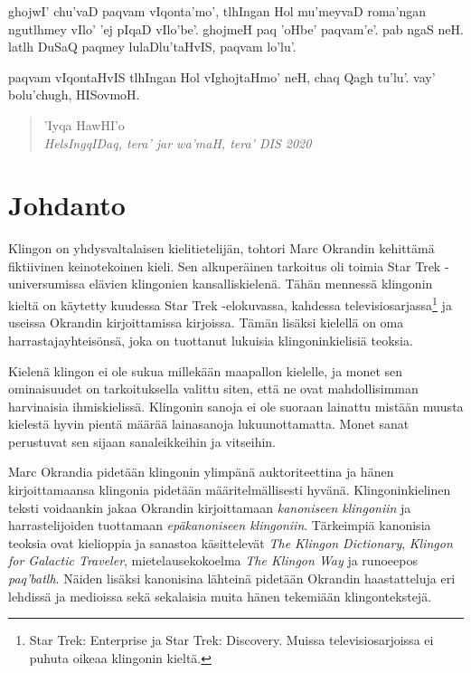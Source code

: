 \documentclass{book}
\begin{document}
ghojwI' chu'vaD paqvam vIqonta'mo', tlhIngan Hol mu'meyvaD roma'ngan ngutlhmey vIlo' 'ej pIqaD vIlo'be'.
ghojmeH paq 'oHbe' paqvam'e'. pab ngaS neH. latlh DuSaQ paqmey lulaDlu'taHvIS, paqvam lo'lu'.

paqvam vIqontaHvIS tlhIngan Hol vIghojtaHmo' neH, chaq Qagh tu'lu'.
vay' bolu'chugh, HISovmoH.

\begin{quote}
    'Iyqa HawHI'o \\
    \textit{HelsIngqIDaq, tera' jar wa'maH, tera' DIS 2020}
\end{quote}

\tableofcontents

\mainmatter

\chapter{Johdanto}

Klingon on yhdysvaltalaisen kielitietelijän, tohtori Marc Okrandin kehittämä fiktiivinen keinotekoinen kieli. Sen alkuperäinen tarkoitus oli toimia Star Trek -universumissa elävien klingonien kansalliskielenä. Tähän mennessä klingonin kieltä on käytetty kuudessa Star Trek -elokuvassa, kahdessa televisiosarjassa\footnote{Star Trek: Enterprise ja Star Trek: Discovery. Muissa televisiosarjoissa ei puhuta oikeaa klingonin kieltä.} ja useissa Okrandin kirjoittamissa kirjoissa. Tämän lisäksi kielellä on oma harrastajayhteisönsä, joka on tuottanut lukuisia klingoninkielisiä teoksia.

Kielenä klingon ei ole sukua millekään maapallon kielelle, ja monet sen ominaisuudet on tarkoituksella valittu siten, että ne ovat mahdollisimman harvinaisia ihmiskielissä. Klingonin sanoja ei ole suoraan lainattu mistään muusta kielestä hyvin pientä määrää lainasanoja lukuunottamatta. Monet sanat perustuvat sen sijaan sanaleikkeihin ja vitseihin.

Marc Okrandia pidetään klingonin ylimpänä auktoriteettina ja hänen kirjoittamaansa klingonia pidetään määritelmällisesti hyvänä. Klingoninkielinen teksti voidaankin jakaa Okrandin kirjoittamaan \textit{kanoniseen klingoniin} ja harrastelijoiden tuottamaan \textit{epäkanoniseen klingoniin}. Tärkeimpiä kanonisia teoksia ovat kielioppia ja sanastoa käsittelevät \textit{The Klingon Dictionary}, \textit{Klingon for Galactic Traveler}, mietelausekokoelma \textit{The Klingon Way} ja runoeepos \textit{paq'batlh}. Näiden lisäksi kanonisina lähteinä pidetään Okrandin haastatteluja eri lehdissä ja medioissa sekä sekalaisia muita hänen tekemiään klingontekstejä.
\end{document}
